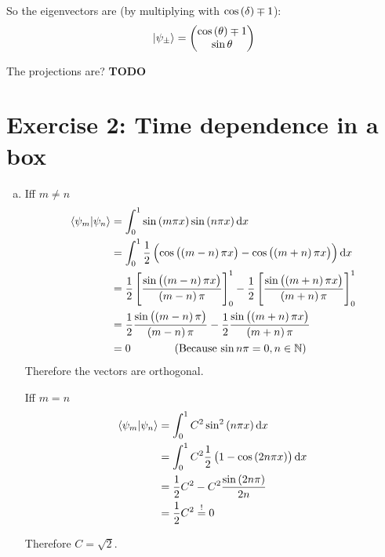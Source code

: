 \documentclass[a4paper,german,12pt,smallheadings]{scrartcl}
\begin{document}
\begin{enumerate}[a)]
    So the eigenvectors are (by multiplying with $\cos\del\delta \mp 1$):
    \begin{equation*}
    \ket{\psi_\pm} = \begin{pmatrix} \cos\del\theta \mp 1 \\ \sin\theta \end{pmatrix}
    \end{equation*}

    The projections are? \textbf{TODO}

\end{enumerate}
\section*{Exercise 2: Time dependence in a box}
\begin{enumerate}[a)]
  \item
    Iff $m \neq n$
    \begin{align*}
      \braket{\psi_m|\psi_n} &= \int_0^1 \sin\del{m \pi x} \sin\del{n \pi x} \dif x \\
                             &= \int_0^1 \frac{1}{2} \del{\cos\del{\del{m-n}\pi x} - \cos\del{\del{m+n}\pi x}} \dif x \\
                             &= \frac{1}{2} \sbr{\frac{\sin\del{\del{m-n}\pi x}}{\del{m-n} \pi}}_0^1
                                - \frac{1}{2} \sbr{\frac{\sin\del{\del{m+n}\pi x}}{\del{m+n} \pi}}_0^1 \\
                             &= \frac{1}{2} \frac{\sin\del{\del{m-n}\pi}}{\del{m-n} \pi}
                                - \frac{1}{2} \frac{\sin\del{\del{m+n}\pi x}}{\del{m+n} \pi} \\
                             &= 0 \qquad\qquad \text{(Because $\sin n \pi = 0, n \in \mathbb{N}$)}
    \end{align*}
    Therefore the vectors are orthogonal.

    Iff $m = n$
    \begin{align*}
      \braket{\psi_m|\psi_n} &= \int_0^1 C^2 \sin^2\del{n \pi x} \dif x \\
                             &= \int_0^1 C^2 \frac{1}{2}\del{1 - \cos\del{2n \pi x}} \dif x \\
                             &= \frac{1}{2}C^2 - C^2 \frac{\sin\del{2n \pi}}{2n} \\
                             &= \frac{1}{2}C^2 \overset{!}{=} 0
    \end{align*}

    Therefore $C = \sqrt{2}$.


\end{enumerate}
\end{document}
